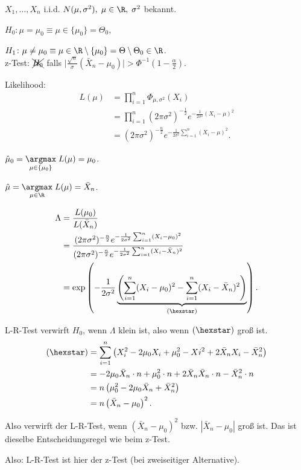 \documentclass{tstextbook}
\begin{document}
\begin{example}
	$ X_1,\ldots,X_n $ i.i.d. $ N(\mu,\sigma^2), \; \mu\in\R, \; \sigma^2 $ bekannt. 
	
	$ H_0\colon\mu=\mu_0 \equiv \mu\in\lbrace\mu_0\rbrace = \Theta_0 $, 
	
	
	$ H_1\colon\mu\ne\mu_0 \equiv \mu\in\R\setminus\lbrace\mu_0\rbrace = \Theta\setminus\Theta_0 \in \R $. \\
	
	z-Test: $ \xcancel{H_0} $ falls $ \big|\frac{\sqrt{n}}{\sigma}(\bar{X}_n-\mu_0)\big| > \Phi^{-1}\left(1-\frac{\alpha}{2}\right) $.
	
	Likelihood: 
	\[
	\begin{aligned}
		L(\mu) & = \prod_{i=1}^{n}\Phi_{\mu,\sigma^2}(X_i) \\
		& = \prod_{i=1}^{n}(2\pi\sigma^2)^{-\frac{1}{2}} e^{-\frac{1}{2\sigma^2}(X_i-\mu)^2} \\
		& = (2\pi\sigma^2)^{-\frac{n}{2}} e^{-\frac{1}{2\sigma^2}\sum_{i=1}^{n}(X_i-\mu)^2} .
	\end{aligned}
	\]
	
	$ \hat{\mu}_0 = \underset{\mu\in\lbrace\mu_0\rbrace}{\argmax} \; L(\mu) = \mu_0 $. 
	
	$ \hat{\mu} = \underset{\mu\in\R}{\argmax} \; L(\mu) = \bar{X}_n $. 
	
	\[
	\begin{aligned}
		\Lambda & = \frac{L(\mu_0)}{L(\bar{X}_n)} \\
		& = \frac{(2\pi\sigma^2)^{-\frac{n}{2}} e^{-\frac{1}{2\sigma^2}\sum_{i=1}^{n}(X_i-\mu_0)^2}}{(2\pi\sigma^2)^{-\frac{n}{2}} e^{-\frac{1}{2\sigma^2}\sum_{i=1}^{n}(X_i-\bar{X}_n)^2}} \\
		& = \exp\left(-\frac{1}{2\sigma^2}\underbrace{\left(\sum_{i=1}^{n}(X_i-\mu_0)^2-\sum_{i=1}^{n}(X_i-\bar{X}_n)^2\right)}_{(\hexstar)}\right).
	\end{aligned}
	\]
	
	L-R-Test verwirft $ H_0 $, wenn $ \Lambda $ klein ist, also wenn $ (\hexstar) $ groß ist. 
	\[
	\begin{aligned}
		(\hexstar) & = \sum_{i=1}^{n}\left(X_i^2-2\mu_0X_i+\mu_0^2-Xi^2+2\bar{X}_n X_i -\bar{X}_n^2\right) \\
		& = -2\mu_0\bar{X}_n\cdot n + \mu_0^2\cdot n + 2\bar{X}_n\bar{X}_n\cdot n -\bar{X}_n^2\cdot n \\
		& = n\left(\mu_0^2-2\mu_0\bar{X}_n+\bar{X}_n^2\right) \\
		& = n\left(\bar{X}_n-\mu_0\right)^2.
	\end{aligned}
	\]
	
	Also verwirft der L-R-Test, wenn $ \left(\bar{X}_n-\mu_0\right)^2 $ bzw. $ |\bar{X}_n-\mu_0| $ groß ist. Das ist dieselbe Entscheidungsregel wie beim z-Test. 
	
	Also: L-R-Test ist hier der z-Test (bei zweiseitiger Alternative).
	
\end{example}
\end{document}

